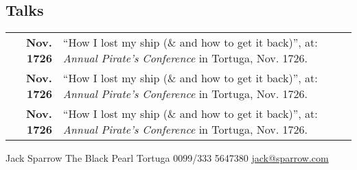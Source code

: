 \documentclass{modernsimplecv}
\newlength{\rightcolwidth}
\begin{document}
\begin{paracol}{2}
\begin{minipage}[t]{\rightcolwidth}
\section*{Talks}
\begin{tabular}{>{\footnotesize\bfseries}r >{\footnotesize}p{}}
    Nov. 1726 & ``How I lost my ship (\& and how to get it back)'', at: \emph{Annual Pirate's Conference} in Tortuga, Nov. 1726. \\
    Nov. 1726 & ``How I lost my ship (\& and how to get it back)'', at: \emph{Annual Pirate's Conference} in Tortuga, Nov. 1726. \\
    Nov. 1726 & ``How I lost my ship (\& and how to get it back)'', at: \emph{Annual Pirate's Conference} in Tortuga, Nov. 1726.
\end{tabular}
\end{minipage}









\end{paracol}

\vfill{} %

\setlength{\parindent}{0pt}
\begin{minipage}[t]{\textwidth}
\begin{center}\fontfamily{\sfdefault}\selectfont \color{black!70}
{\small Jack Sparrow  The Black Pearl  Tortuga  0099/333 5647380 
 \protect\url{jack@sparrow.com}
}
\end{center}
\end{minipage}
\end{document}
